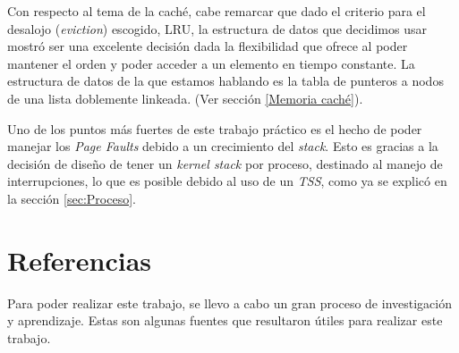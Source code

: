 \documentclass[a4paper,10pt]{article}
\begin{document}
Con respecto al tema de la caché, cabe remarcar que dado el criterio para el desalojo (\textit{eviction}) escogido, LRU, la estructura de datos que decidimos usar mostró ser una 
excelente decisión dada la flexibilidad que ofrece al poder mantener el orden y poder acceder a un elemento en tiempo constante. La estructura de datos de la que estamos hablando es 
la tabla de punteros a nodos de una lista doblemente linkeada. (Ver sección \ref{Memoria caché}).

Uno de los puntos más fuertes de este trabajo práctico es el hecho de poder manejar los \textit{Page Faults} debido a un crecimiento del \textit{stack}. Esto es gracias a la decisión 
de diseño de tener un \textit{kernel stack} por proceso, destinado al manejo de interrupciones, lo que es posible debido al uso de un \textit{TSS}, como ya se explicó en la sección 
\ref{sec:Proceso}.


\newpage     
\section{Referencias}

Para poder realizar este trabajo, se llevo a cabo un gran proceso de investigación y aprendizaje. Estas son algunas fuentes que resultaron útiles para realizar 
este trabajo.\\
\end{document}
